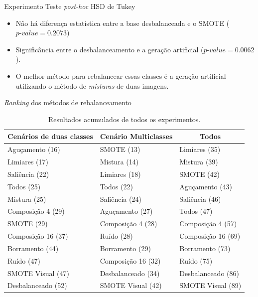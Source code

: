 \documentclass{beamer}
\begin{document}
\begin{frame}{Experimento}
  \setlength\leftmargini{1em}
  Teste \textit{post-hoc} HSD de Tukey
  \begin{itemize}
    \item Não há diferença estatística entre a base desbalanceada e o SMOTE ($\textit{p-value} = 0.2073$)
    \item Significância entre o desbalanceamento e a geração artificial ($\textit{p-value} = 0.0062$).
    \item O melhor método para rebalancear essas classes é a geração artificial utilizando o método de \emph{misturas} de duas imagens.
  \end{itemize}
\end{frame}
\begin{frame}{\textit{Ranking} dos métodos de rebalanceamento}
  \setlength\leftmargini{1em}
  \begin{table}
    \centering
    \caption{Resultados acumulados de todos os experimentos.}
    \tiny{
    \begin{tabular}{|l|l|l|}
      \hline
      \multicolumn{1}{|c|}{\textbf{Cenários de duas classes}} & \multicolumn{1}{c|}{\textbf{Cenário Multiclasses}} & \multicolumn{1}{c|}{\textbf{Todos}} \\ \hline
      Aguçamento (16)       & SMOTE (13)          & Limiares (35)                       \\ \hline
      Limiares (17)         & Mistura (14)        & Mistura (39)                        \\ \hline
      Saliência (22)        & Limiares (18)       & SMOTE (42)                          \\ \hline
      Todos (25)            & Todos (22)          & Aguçamento (43)                     \\ \hline
      Mistura (25)          & Saliência (24)      & Saliência (46)                      \\ \hline
      Composição 4 (29)     & Aguçamento (27)     & Todos (47)                          \\ \hline
      SMOTE (29)            & Composição 4 (28)   & Composição 4 (57)                   \\ \hline
      Composição 16 (37)    & Ruído (28)          & Composição 16 (69)                  \\ \hline
      Borramento (44)       & Borramento (29)     & Borramento (73)                     \\ \hline
      Ruído (47)            & Composição 16 (32)  & Ruído (75)                          \\ \hline
      SMOTE Visual (47)     & Desbalanceado (34)  & Desbalanceado (86)                  \\ \hline
      Desbalanceado (52)    & SMOTE Visual (42)   & SMOTE Visual (89)                   \\ \hline
    \end{tabular}
    }
  \end{table}
\end{frame}
\end{document}
